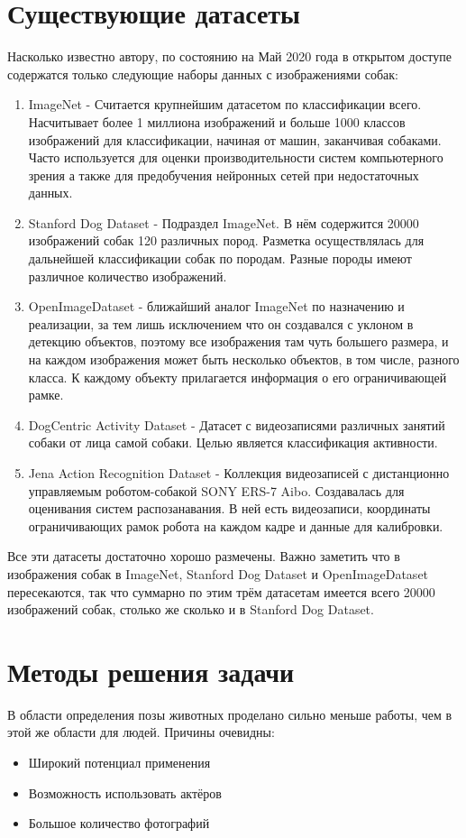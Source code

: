 \section{Существующие датасеты} \label{sect1_2}
Насколько известно автору, по состоянию на Май 2020 года в открытом доступе содержатся только следующие наборы данных с изображениями собак:
\begin{enumerate}
  \item ImageNet \cite{imagenet} - Считается крупнейшим датасетом по классификации всего. Насчитывает более 1 миллиона изображений и больше 1000 классов изображений для классификации, начиная от машин, заканчивая собаками. Часто используется для оценки производительности систем компьютерного зрения а также для предобучения нейронных сетей при недостаточных данных.
  \item Stanford Dog Dataset \cite{KhoslaYaoJayadevaprakashFeiFei_FGVC2011} - Подраздел ImageNet. В нём содержится 20000 изображений собак 120 различных пород. Разметка осуществлялась для дальнейшей классификации собак по породам. Разные породы имеют различное количество изображений.
  \item OpenImageDataset \cite{openimages} - ближайший аналог ImageNet по назначению и реализации, за тем лишь исключением что он создавался с уклоном в детекцию объектов, поэтому все изображения там чуть большего размера, и на каждом изображения может быть несколько объектов, в том числе, разного класса. К каждому объекту прилагается информация о его ограничивающей рамке.
  \item DogCentric Activity Dataset \cite{yumi2014first} - Датасет с видеозаписями различных занятий собаки от лица самой собаки. Целью является классификация активности.
  \item Jena Action Recognition Dataset \cite{jena} - Коллекция видеозаписей с дистанционно управляемым роботом-собакой SONY ERS-7 Aibo. Создавалась для оценивания систем распозанавания. В ней есть видеозаписи, координаты ограничивающих рамок робота на каждом кадре и данные для калибровки.
\end{enumerate}
Все эти датасеты достаточно хорошо размечены. Важно заметить что в изображения собак в ImageNet, Stanford Dog Dataset и OpenImageDataset пересекаются, так что суммарно по этим трём датасетам имеется всего 20000 изображений собак, столько же сколько и в Stanford Dog Dataset.

\section{Методы решения задачи} \label{sect1_3}
В области определения позы животных проделано сильно меньше работы, чем в этой же области для людей. Причины очевидны:
\begin{itemize}
    \item Широкий потенциал применения
    \item Возможность использовать актёров
    \item Большое количество фотографий
\end{itemize}

